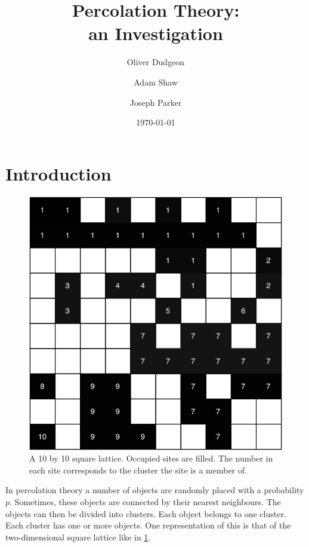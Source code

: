 \documentclass[%
 reprint,
 amsmath,amssymb,
 aps,
]{revtex4-2}
\begin{document}

\title{Percolation Theory:\\an Investigation}%

\author{Oliver Dudgeon}
\author{Adam Shaw}
\author{Joseph Parker}

\date{\today}

\begin{abstract}
\lipsum[1]
\end{abstract}

\maketitle

\section{Introduction}

\begin{figure}
    \centering
    \includegraphics[width=0.7\linewidth]{report/assets/grid.pdf}
    \caption{A 10 by 10 square lattice. Occupied sites are filled. The number in each site corresponds to the cluster the site is a member of. }
    \label{fig:2D_lat}
\end{figure}

In percolation theory a number of objects are randomly placed with a probability $p$. Sometimes, these objects are connected by their nearest neighbours. The objects can then be divided into clusters. Each object belongs to one cluster. Each cluster has one or more objects. One representation of this is that of the two-dimensional square lattice like in \cref{fig:2D_lat}. 
\end{document}
